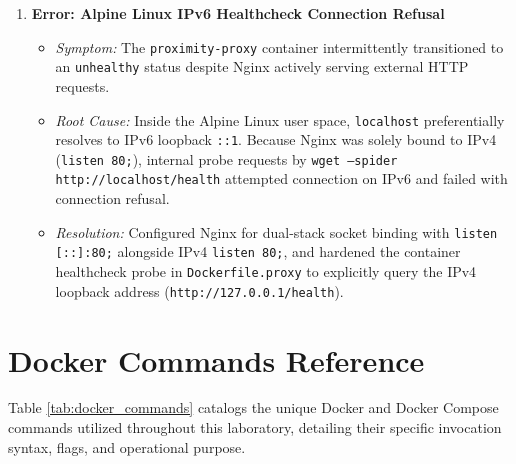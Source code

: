 \documentclass[11pt,a4paper]{article}
\begin{document}
\begin{enumerate}
    \item \textbf{Error: Alpine Linux IPv6 Healthcheck Connection Refusal}
    \begin{itemize}
        \item \emph{Symptom:} The \texttt{proximity-proxy} container intermittently transitioned to an \texttt{unhealthy} status despite Nginx actively serving external HTTP requests.
        \item \emph{Root Cause:} Inside the Alpine Linux user space, \texttt{localhost} preferentially resolves to IPv6 loopback \texttt{::1}. Because Nginx was solely bound to IPv4 (\texttt{listen 80;}), internal probe requests by \texttt{wget --spider http://localhost/health} attempted connection on IPv6 and failed with connection refusal.
        \item \emph{Resolution:} Configured Nginx for dual-stack socket binding with \texttt{listen [::]:80;} alongside IPv4 \texttt{listen 80;}, and hardened the container healthcheck probe in \texttt{Dockerfile.proxy} to explicitly query the IPv4 loopback address (\texttt{http://127.0.0.1/health}).
    \end{itemize}
\end{enumerate}

\section{Docker Commands Reference}

Table \ref{tab:docker_commands} catalogs the unique Docker and Docker Compose commands utilized throughout this laboratory, detailing their specific invocation syntax, flags, and operational purpose.
\end{document}
